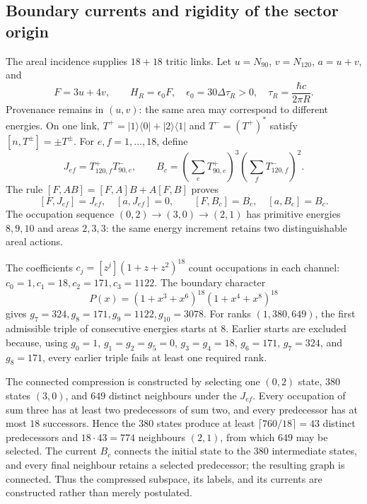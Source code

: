 \subsection{Boundary currents and rigidity of the sector origin}

The areal incidence supplies $18+18$ tritic links. Let
$u=N_{90}$, $v=N_{120}$, $a=u+v$, and
\[
 F=3u+4v,\qquad H_R=\epsilon_0F,
 \quad \epsilon_0=30\Delta\tau_R>0,
 \quad \tau_R=\frac{\hbar c}{2\pi R}.
\]
Provenance remains in $(u,v)$: the same area may correspond to different
energies. On one link,
$T^+=|1\rangle\langle0|+|2\rangle\langle1|$ and $T^-=(T^+)^*$ satisfy
$[n,T^\pm]=\pm T^\pm$. For $e,f=1,\ldots,18$, define
\[
 J_{ef}=T^+_{120,f}T^-_{90,e},\qquad
 B_c=\left(\sum_eT^+_{90,e}\right)^3
     \left(\sum_fT^-_{120,f}\right)^2.
\]
The rule $[F,AB]=[F,A]B+A[F,B]$ proves
\[
 [F,J_{ef}]=J_{ef},\quad[a,J_{ef}]=0,
 \qquad [F,B_c]=B_c,\quad[a,B_c]=B_c.
\]
The occupation sequence
$(0,2)\to(3,0)\to(2,1)$ has primitive energies $8,9,10$ and areas
$2,3,3$: the same energy increment retains two distinguishable areal
actions.

The coefficients $c_j=[z^j](1+z+z^2)^{18}$ count occupations in each
channel: $c_0=1,c_1=18,c_2=171,c_3=1122$. The boundary character
\[
 P(x)=(1+x^3+x^6)^{18}(1+x^4+x^8)^{18}
\]
gives $g_7=324,g_8=171,g_9=1122,g_{10}=3078$. For ranks
$(1,380,649)$, the first admissible triple of consecutive energies starts
at $8$. Earlier starts are excluded because, using
$g_0=1$, $g_1=g_2=g_5=0$, $g_3=g_4=18$, $g_6=171$, $g_7=324$, and
$g_8=171$, every earlier triple fails at least one required rank.

The connected compression is constructed by selecting one $(0,2)$ state,
$380$ states $(3,0)$, and $649$ distinct neighbours under the $J_{ef}$.
Every occupation of sum three has at least two predecessors of sum two,
and every predecessor has at most $18$ successors. Hence the $380$ states
produce at least $\lceil760/18\rceil=43$ distinct predecessors and
$18\cdot43=774$ neighbours $(2,1)$, from which $649$ may be selected.
The current $B_c$ connects the initial state to the $380$ intermediate
states, and every final neighbour retains a selected predecessor; the
resulting graph is connected. Thus the compressed subspace, its labels,
and its currents are constructed rather than merely postulated.

